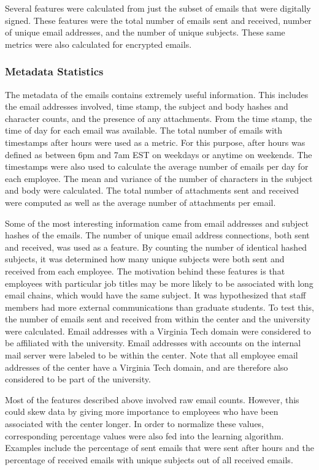 \documentclass[12pt]{report}
\begin{document}
Several features were calculated from just the subset of emails that were digitally signed.  These features were the total number of emails sent and received, number of unique email addresses, and the number of unique subjects.
These same metrics were also calculated for encrypted emails.

\subsubsection{Metadata Statistics}
The metadata of the emails contains extremely useful information.  This includes the email addresses involved, time stamp, the subject and body hashes and character counts, and the presence of any attachments.
From the time stamp, the time of day for each email was available.
The total number of emails with timestamps after hours were used as a metric.
For this purpose, after hours was defined as between 6pm and 7am EST on weekdays or anytime on weekends.
The timestamps were also used to calculate the average number of emails per day for each employee.
The mean and variance of the number of characters in the subject and body were calculated.
The total number of attachments sent and received were computed as well as the average number of attachments per email.

Some of the most interesting information came from email addresses and subject hashes of the emails.
The number of unique email address connections, both sent and received, was used as a feature.
By counting the number of identical hashed subjects, it was determined how many unique subjects were both sent and received from each employee.
The motivation behind these features is that employees with particular job titles may be more likely to be associated with long email chains, which would have the same subject.
It was hypothesized that staff members had more external communications than graduate students.
To test this, the number of emails sent and received from within the center and the university were calculated.
Email addresses with a Virginia Tech domain were considered to be affiliated with the university.
Email addresses with accounts on the internal mail server were labeled to be within the center.
Note that all employee email addresses of the center have a Virginia Tech domain, and are therefore also considered to be part of the university.


Most of the features described above involved raw email counts.
However, this could skew data by giving more importance to employees who have been associated with the center longer.
In order to normalize these values, corresponding percentage values were also fed into the learning algorithm.
Examples include the percentage of  sent emails that were sent after hours and the percentage of received emails with unique subjects out of all received emails.
\end{document}
